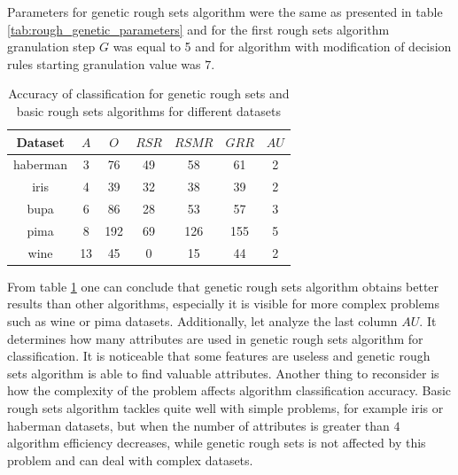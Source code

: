 Parameters for genetic rough sets algorithm were the same as presented in table
\ref{tab:rough_genetic_parameters} and for the first rough sets algorithm
granulation step $G$ was equal to 5 and for algorithm with modification of
decision rules starting granulation value was $7$.
\begin{table}[H]
    \caption{Accuracy of classification for genetic rough sets and basic rough
    sets algorithms for different datasets}
    \centering
    \begin{tabular}{|c|c|c|c|c|c|c|}
        \hline
        Dataset & $A$ & $O$ & $RSR$ & $RSMR$ & $GRR$ & $AU$\\ 
        \hline \hline
        haberman& 3&	76&	49&	58&	61 & 2 \\ \hline
        iris&	4&	39&	32&	38&	39 & 2\\ \hline
        bupa&  	6&	86&	28&	53&	57 & 3\\ \hline 
        pima&   8&	192&	69&	126& 155 & 5 \\ \hline
        wine& 13&	45&	0&	15&	44 & 2\\ \hline
    \end{tabular}
    \label{tab:genetic_rough_results}
\end{table}
From table \ref{tab:genetic_rough_results} one can conclude that genetic rough
sets algorithm obtains better results than other algorithms, especially it is
visible for more complex problems such as wine or pima datasets. Additionally,
let analyze the last column $AU$. It determines how many attributes are used in
genetic rough sets algorithm for classification. It is noticeable that some
features are useless and genetic rough sets algorithm is able to find
valuable attributes. Another thing to reconsider is how the complexity of the
problem affects algorithm classification accuracy. Basic rough sets algorithm
tackles quite well with simple problems, for example iris or haberman datasets,
but when the number of attributes is greater than $4$ algorithm efficiency
decreases, while genetic rough sets is not affected by this problem and can
deal with complex datasets.


